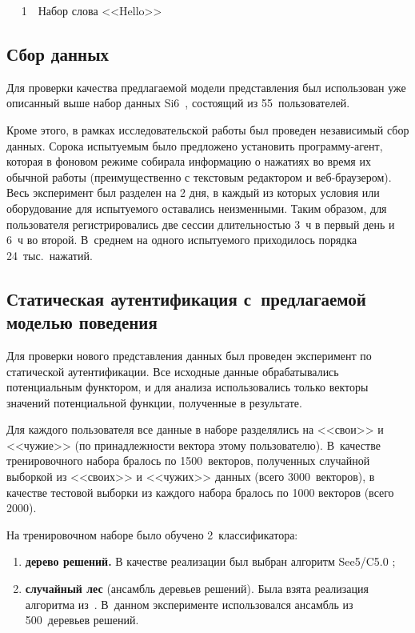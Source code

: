\begin{multicols}{2}
\addtocounter{table}{1}

\noindent
\begin{center}  %
\vspace*{3pt}
  \mbox{%
 \epsfxsize=77.374mm
 }
 \vspace*{6pt}
{{\figurename~1}\ \ \small{Набор слова <<{\sf Hello}>>}}
 \end{center}

\addtocounter{figure}{1}

\subsection{Сбор данных}

Для проверки качества предлагаемой модели представления был
использован уже описанный выше набор данных Si6~\cite{si6},
состоящий из 55~пользователей.

Кроме этого, в рамках исследовательской работы был проведен
независимый сбор данных. Сорока испытуемым было предложено установить
про\-грам\-му-агент, которая в фоновом режиме собирала информацию о
нажатиях во время их обычной работы (преимущественно с текстовым
редактором и веб-брау\-зе\-ром). Весь эксперимент был  разделен на 2
дня, в каждый из которых условия или оборудование для  испытуемого
оставались неизменными. Таким образом, для пользователя
регистрировались две сессии длительностью 3~ч в первый день и 6~ч 
во второй. В~среднем на одного испытуемого приходилось порядка
24~тыс.\ нажатий.

\subsection{Статическая аутентификация с~предлагаемой моделью поведения}

Для проверки нового представления данных был проведен эксперимент по
статической аутентификации. Все исходные данные обрабатывались
потенциальным функтором, и для анализа использовались только векторы
значений потенциальной функции, полученные в результате.

Для каждого пользователя все данные в наборе разделялись на <<свои>>
и <<чужие>> (по принадлежности вектора этому пользователю). 
В~качестве тренировочного набора бралось по 1500~векторов, полученных
случайной выборкой из <<своих>> и <<чужих>> данных (всего 
3000~векторов), в качестве тес\-то\-вой выборки из каждого набора бралось по
1000 векторов (всего 2000).

На тренировочном наборе было обучено 2~классификатора:
\begin{enumerate}[(1)]
\item \textbf{дерево решений.} В качестве реализации был выбран алгоритм 
See5/C5.0 \cite{c50};
\item \textbf{случайный лес} (ансамбль деревьев решений). Была 
взята реализация алгоритма из~\cite{rf}. В~данном эксперименте использовался 
ансамбль из 500~деревьев решений.
\end{enumerate}


\end{multicols}
